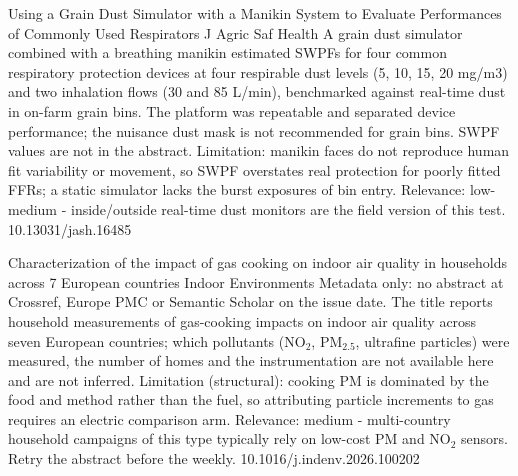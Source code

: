 \documentclass[10pt]{article}
\begin{document}
\par{}\baselineskip{}\baselineskip
{}

{Using a Grain Dust Simulator with a Manikin System to Evaluate Performances of Commonly Used Respirators}
{J Agric Saf Health}
{A grain dust simulator combined with a breathing manikin estimated SWPFs for four common respiratory protection devices at four respirable dust levels (5, 10, 15, 20 mg/m3) and two inhalation flows (30 and 85 L/min), benchmarked against real-time dust in on-farm grain bins. The platform was repeatable and separated device performance; the nuisance dust mask is not recommended for grain bins. SWPF values are not in the abstract. Limitation: manikin faces do not reproduce human fit variability or movement, so SWPF overstates real protection for poorly fitted FFRs; a static simulator lacks the burst exposures of bin entry. Relevance: low-medium - inside/outside real-time dust monitors are the field version of this test.}
{10.13031/jash.16485}

{Characterization of the impact of gas cooking on indoor air quality in households across 7 European countries}
{Indoor Environments}
{Metadata only: no abstract at Crossref, Europe PMC or Semantic Scholar on the issue date. The title reports household measurements of gas-cooking impacts on indoor air quality across seven European countries; which pollutants (NO$_2$, PM$_{2.5}$, ultrafine particles) were measured, the number of homes and the instrumentation are not available here and are not inferred. Limitation (structural): cooking PM is dominated by the food and method rather than the fuel, so attributing particle increments to gas requires an electric comparison arm. Relevance: medium - multi-country household campaigns of this type typically rely on low-cost PM and NO$_2$ sensors. Retry the abstract before the weekly.}
{10.1016/j.indenv.2026.100202}

\par{}\baselineskip{}\baselineskip
{}
\end{document}
